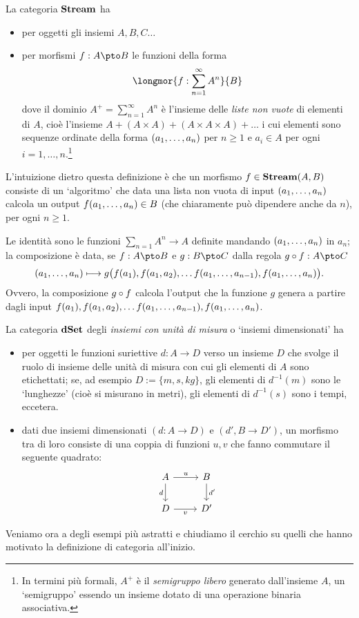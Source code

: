 \begin{example}\label{example_streams}
	La categoria \(\mathbf{Stream}\) ha
	\begin{itemize}
		\item per oggetti gli insiemi \(A,B,C\dots\)
		\item per morfismi \(f : A\pto B\) le funzioni della forma
		      \[\longmor{f : \sum_{n=1}^\infty A^n}{B}\]
		      dove il dominio \(A^+=\sum_{n=1}^\infty A^n\) è l'insieme delle \emph{liste non vuote} di elementi di \(A\), cioè l'insieme \(A + (A\times A) + (A\times A\times A) + \dots\) i cui elementi sono sequenze ordinate della forma \((\tup an,)\) per \(n\ge 1\) e \(a_i\in A\) per ogni \(i=1,\dots,n\).\footnote{In termini più formali, \(A^+\) è il \emph{semigruppo libero} generato dall'insieme \(A\), un `semigruppo' essendo un insieme dotato di una operazione binaria associativa.}
	\end{itemize}
	L'intuizione dietro questa definizione è che un morfismo \(f \in \mathbf{Stream}(A,B)\) consiste di un `algoritmo' che data una lista non vuota di input \((\tup an,)\) calcola un output \(f(\tup an,)\in B\) (che chiaramente può dipendere anche da \(n\)), per ogni \(n\ge 1\).

	Le identità sono le funzioni \(\sum_{n=1} A^n\to A\) definite mandando \((\tup an,)\) in \(a_n\); la composizione è data, se \(f : A\pto B\) e \(g : B\pto C\) dalla regola \(g\cmp f : A\pto C\)
	\[(\tup an,)\longmapsto g\big(f(a_1),f(a_1,a_2),\dots f(\tup a{n-1},),f(\tup an,)\big).\]
	Ovvero, la composizione \(g\circ f\) calcola l'output che la funzione \(g\) genera a partire dagli input \(f(a_1),f(a_1,a_2),\dots f(\tup a{n-1},),f(\tup an,)\).
\end{example}
\begin{example}\label{example_dimensionati}
	La categoria \(\mathbf{dSet}\) degli \emph{insiemi con unità di misura} o `insiemi dimensionati' ha
	\begin{itemize}
		\item per oggetti le funzioni suriettive \(d : A\to D\) verso un insieme \(D\) che svolge il ruolo di insieme delle unità di misura con cui gli elementi di \(A\) sono etichettati; se, ad esempio \(D := \{m,s,kg\}\), gli elementi di \(d^{-1}(m)\) sono le `lunghezze' (cioè si misurano in metri), gli elementi di \(d^{-1}(s)\) sono i tempi, eccetera.
		\item dati due insiemi dimensionati \((d : A\to D)\) e \((d', B\to D')\), un morfismo tra di loro consiste di una coppia di funzioni \(u,v\) che fanno commutare il seguente quadrato:
		      \[\begin{tikzcd}
				      A\ar[r, "u"]\ar[d,"d"'] & B \ar[d, "d'"]\\
				      D \ar[r, "v"']& D'
			      \end{tikzcd}\]
	\end{itemize}
\end{example}
Veniamo ora a degli esempi più astratti e chiudiamo il cerchio su quelli che hanno motivato la definizione di categoria all'inizio.

